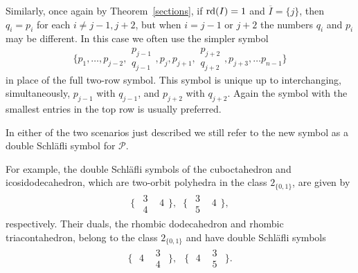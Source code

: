 \documentclass[12pt]{article}
\renewcommand{\bar}{\overline}
\renewcommand{\>}{\rangle}
\theoremstyle{definition}\newtheorem{definition}{Definition}[section]
\begin{document}
Similarly, once again by Theorem~\ref{sections}, if ${\rm rd}(I)=1$ and $\bar{I}=\{j\}$, then $q_i=p_i$ for each $i \neq j-1, j+2$, but when $i=j-1$ or $j+2$ the numbers $q_i$ and $p_i$ may be different. In this case we often use the simpler symbol
\begin{equation}
\label{doubleSch3}
\Big\{p_1, \dots, p_{j-2}, \begin{matrix} p_{j-1} \\ q_{j-1} \end{matrix}, p_{j}, p_{j+1},\begin{matrix} p_{j+2} \\ q_{j+2} \end{matrix}, p_{j+3}, \dots p_{n-1}\Big\}
\end{equation}
in place of the full two-row symbol. This symbol is unique up to interchanging, simultaneously, $p_{j-1}$ with $q_{j-1}$, and $p_{j+2}$ with $q_{j+2}$. Again the symbol with the smallest entries in the top row is usually preferred.

In either of the two scenarios just described we still refer to the new symbol as a double Schl\"afli symbol for $\mathcal{P}$.

For example, the double Schl\"afli symbols of the cuboctahedron and icosidodecahedron, which are two-orbit polyhedra in the class $2_{\{0,1\}}$, are given by 
\[\Big\{\!\!\!\!
\begin{array}{rl}
\begin{array}{l} 3\\ 4\end{array}&\!\!\!\!4
\end{array}
\!\!\Big\},
\;\;
\Big\{\!\!\!\!
\begin{array}{rl}
\begin{array}{l} 3\\ 5\end{array}&\!\!\!\!4
\end{array}
\!\!\Big\},\] 
respectively. Their duals, the rhombic dodecahedron and rhombic triacontahedron, belong to the class $2_{\{0,1\}}$ and have double Schl\"afli symbols
\[\Big\{\!\!\!\!
\begin{array}{rl}
\;4&\!\!\!\!\begin{array}{l} 3\\ 4\end{array}\!\!
\end{array}
\!\!\Big\},
\;\;\,
\Big\{\!\!\!\!
\begin{array}{rl}
\;4&\!\!\!\!\begin{array}{l} 3\\ 5\end{array}\!\!
\end{array}
\!\!\Big\}.\] 
\end{document}
